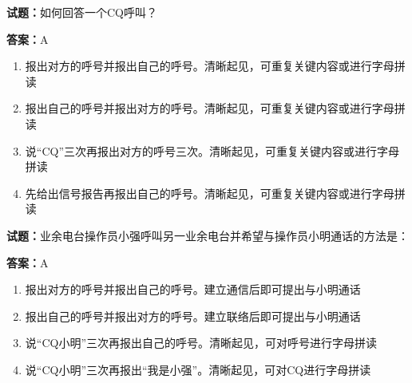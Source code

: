 \documentclass{ctexbook}
\begin{document}




\vspace{1em}

\textbf{试题：}如何回答一个CQ呼叫？ 

\textbf{答案：}A 

\begin{enumerate}[leftmargin=3em]
  \item 报出对方的呼号并报出自己的呼号。清晰起见，可重复关键内容或进行字母拼读 

  \item 报出自己的呼号并报出对方的呼号。清晰起见，可重复关键内容或进行字母拼读 

  \item 说“CQ”三次再报出对方的呼号三次。清晰起见，可重复关键内容或进行字母拼读 

  \item 先给出信号报告再报出自己的呼号。清晰起见，可重复关键内容或进行字母拼读 

\end{enumerate}





\vspace{1em}

\textbf{试题：}业余电台操作员小强呼叫另一业余电台并希望与操作员小明通话的方法是： 

\textbf{答案：}A 

\begin{enumerate}[leftmargin=3em]
  \item 报出对方的呼号并报出自己的呼号。建立通信后即可提出与小明通话 

  \item 报出自己的呼号并报出对方的呼号。建立联络后即可提出与小明通话 

  \item 说“CQ小明”三次再报出自己的呼号。清晰起见，可对呼号进行字母拼读 

  \item 说“CQ小明”三次再报出“我是小强”。清晰起见，可对CQ进行字母拼读 

\end{enumerate}





\vspace{1em}
\end{document}

